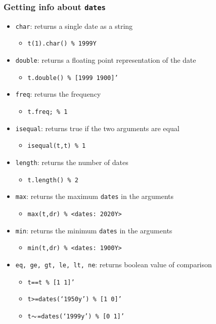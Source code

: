 \documentclass[10pt]{beamer}
\begin{document}
\begin{frame}[fragile,t]
  \frametitle{Getting info about \texttt{dates}}
  \begin{itemize}
  \item \texttt{char}: returns a single date as a string
    \begin{itemize}
    \item \texttt{t(1).char() \% 1999Y}
    \end{itemize}
  \item \texttt{double}: returns a floating point representation of the date
    \begin{itemize}
    \item \texttt{t.double() \% [1999 1900]'}
    \end{itemize}
  \item \texttt{freq}: returns the frequency
    \begin{itemize}
    \item \texttt{t.freq; \% 1}
    \end{itemize}
  \item \texttt{isequal}: returns true if the two arguments are equal
    \begin{itemize}
    \item \texttt{isequal(t,t) \% 1}
    \end{itemize}
  \item \texttt{length}: returns the number of dates
    \begin{itemize}
    \item \texttt{t.length() \% 2}
    \end{itemize}
  \item \texttt{max}: returns the maximum \texttt{dates} in the arguments
    \begin{itemize}
    \item \texttt{max(t,dr) \% <dates: 2020Y>}
    \end{itemize}
  \item \texttt{min}: returns the minimum \texttt{dates} in the arguments
    \begin{itemize}
    \item \texttt{min(t,dr) \% <dates: 1900Y>}
    \end{itemize}
  \item \texttt{eq, ge, gt, le, lt, ne}: returns boolean value of comparison
    \begin{itemize}
    \item \texttt{t==t \% [1 1]'}
    \item \texttt{t>=dates(`1950y') \% [1 0]'}
    \item \texttt{t$\thicksim$=dates(`1999y') \% [0 1]'}
    \end{itemize}
  \end{itemize}
\end{frame}
\end{document}
